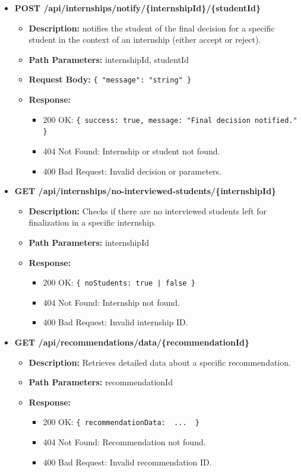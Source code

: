 \begin{itemize}
    \item \textbf{POST /api/internships/notify/\{internshipId\}/\{studentId\}}  
    \begin{itemize}
        \item \textbf{Description:} notifies the student of the final decision for a specific student in the context of an internship (either accept or reject).
        \item \textbf{Path Parameters:} internshipId, studentId  
        \item \textbf{Request Body:} 
        \texttt{\{ 
            "message": "string"
        \}}
        \item \textbf{Response:}
        \begin{itemize}
            \item 200 OK: \texttt{\{ success: true, message: "Final decision notified." \}}
            \item 404 Not Found: Internship or student not found.
            \item 400 Bad Request: Invalid decision or parameters.
        \end{itemize}
    \end{itemize}

    \item \textbf{GET /api/internships/no-interviewed-students/\{internshipId\}}  
    \begin{itemize}
        \item \textbf{Description:} Checks if there are no interviewed students left for finalization in a specific internship.
        \item \textbf{Path Parameters:} internshipId  
        \item \textbf{Response:}
        \begin{itemize}
            \item 200 OK: \texttt{\{ noStudents: true | false \}}
            \item 404 Not Found: Internship not found.
            \item 400 Bad Request: Invalid internship ID.
        \end{itemize}
    \end{itemize}


    \item \textbf{GET /api/recommendations/data/\{recommendationId\}}  
    \begin{itemize}
        \item \textbf{Description:} Retrieves detailed data about a specific recommendation.
        \item \textbf{Path Parameters:} recommendationId  
        \item \textbf{Response:}
        \begin{itemize}
            \item 200 OK: \texttt{\{ recommendationData: { ... } \}}
            \item 404 Not Found: Recommendation not found.
            \item 400 Bad Request: Invalid recommendation ID.
        \end{itemize}
    \end{itemize}


\end{itemize}
